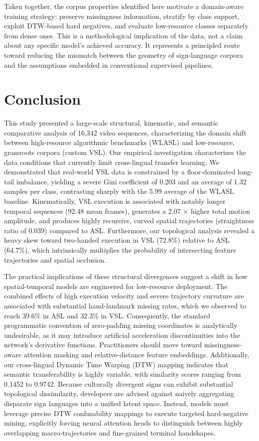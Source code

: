 \documentclass{ieeeaccess}
\begin{document}
Taken together, the corpus properties identified here motivate a domain-aware training strategy: preserve missingness information, stratify by class support, exploit DTW-based hard negatives, and evaluate low-resource classes separately from dense ones. This is a methodological implication of the data, not a claim about any specific model's achieved accuracy. It represents a principled route toward reducing the mismatch between the geometry of sign-language corpora and the assumptions embedded in conventional supervised pipelines.

\section{Conclusion} \label{sec:conclusion}

This study presented a large-scale structural, kinematic, and semantic comparative analysis of 16,342 video sequences, characterizing the domain shift between high-resource algorithmic benchmarks (WLASL) and low-resource, grassroots corpora (custom VSL). Our empirical investigation characterizes the data conditions that currently limit cross-lingual transfer learning. We demonstrated that real-world VSL data is constrained by a floor-dominated long-tail imbalance, yielding a severe Gini coefficient of 0.203 and an average of 1.32 samples per class, contrasting sharply with the 5.99 average of the WLASL baseline. Kinematically, VSL execution is associated with notably longer temporal sequences (92.48 mean frames), generates a 2.07 $\times$ higher total motion amplitude, and produces highly recursive, curved spatial trajectories (straightness ratio of 0.039) compared to ASL. Furthermore, our topological analysis revealed a heavy skew toward two-handed execution in VSL (72.8\%) relative to ASL (64.7\%), which intrinsically multiplies the probability of intersecting feature trajectories and spatial occlusion. 

The practical implications of these structural divergences suggest a shift in how spatial-temporal models are engineered for low-resource deployment. The combined effects of high execution velocity and severe trajectory curvature are associated with substantial hand-landmark missing rates, which we observed to reach 39.6\% in ASL and 32.3\% in VSL. Consequently, the standard programmatic convention of zero-padding missing coordinates is analytically undesirable, as it may introduce artificial acceleration discontinuities into the network's derivative functions. Practitioners should move toward missingness-aware attention masking and relative-distance feature embeddings. Additionally, our cross-lingual Dynamic Time Warping (DTW) mapping indicates that semantic transferability is highly variable, with similarity scores ranging from 0.1452 to 0.9742. Because culturally divergent signs can exhibit substantial topological dissimilarity, developers are advised against naively aggregating disparate sign languages into a unified latent space. Instead, models must leverage precise DTW confusability mappings to execute targeted hard-negative mining, explicitly forcing neural attention heads to distinguish between highly overlapping macro-trajectories and fine-grained terminal handshapes.
\end{document}
